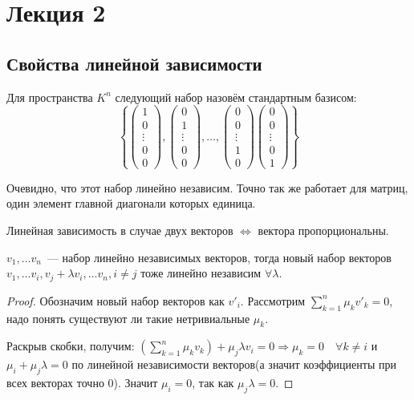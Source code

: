 \section{Лекция 2}
\subsection{Свойства линейной зависимости}
\begin{definition}
    Для пространства $K^n$ следующий набор назовём стандартным
    базисом: $$
    \left\{
    \begin{pmatrix}
    1\\ 0\\ \vdots\\ 0\\ 0
    \end{pmatrix},
    \begin{pmatrix}
    0\\ 1\\ \vdots \\0 \\0
    \end{pmatrix}
    ,\dots,
    \begin{pmatrix}
    0\\ 0\\ \vdots \\1 \\0
    \end{pmatrix}
    \begin{pmatrix}
    0\\ 0\\ \vdots \\0 \\1
    \end{pmatrix}\right\}$$
\end{definition}
\begin{remark}
    Очевидно, что этот набор линейно независим.
    Точно так же работает для матриц, один элемент главной диагонали которых единица.
\end{remark}
\begin{remark}
    Линейная зависимость в случае двух векторов $\Leftrightarrow$ вектора пропорциональны.
\end{remark}
\begin{lemma}
    $v_1,\dots v_n$~--- набор линейно независимых векторов, тогда новый набор векторов
    $v_1, \dots v_i, v_j + \lambda v_i, \dots v_n, i\not=j$ тоже линейно независим $\forall \lambda$.
\end{lemma}
\begin{proof}
    Обозначим новый набор векторов как $v'_i$.
    Рассмотрим $\sum_{k = 1}^{n}\mu_k v'_k = 0$, надо понять существуют ли такие нетривиальные $\mu_k$.

    Раскрыв скобки, получим:
    $(\sum_{k=1}^{n}\mu_kv_k) + \mu_j\lambda v_i = 0 \Rightarrow \mu_k=0\quad\forall k\not=i$ и $\mu_i + \mu_j \lambda = 0$
    по линейной независимости векторов(а значит коэффициенты при всех векторах точно 0).
    Значит $\mu_i=0$, так как $\mu_j\lambda= 0$.
\end{proof}
